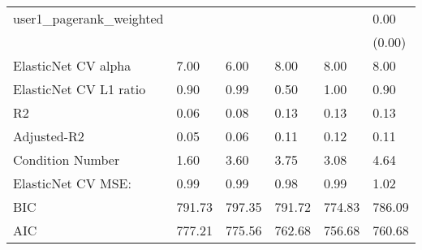 \begin{table}
\begin{center}
\begin{tabular}{llllll}
user1_pagerank_weighted                        &         &         &         &         & 0.00      \\
                                               &         &         &         &         & (0.00)    \\
ElasticNet CV alpha                            & 7.00    & 6.00    & 8.00    & 8.00    & 8.00      \\
ElasticNet CV  L1 ratio                        & 0.90    & 0.99    & 0.50    & 1.00    & 0.90      \\
R2                                             & 0.06    & 0.08    & 0.13    & 0.13    & 0.13      \\
Adjusted-R2                                    & 0.05    & 0.06    & 0.11    & 0.12    & 0.11      \\
Condition Number                               & 1.60    & 3.60    & 3.75    & 3.08    & 4.64      \\
ElasticNet CV MSE:                             & 0.99    & 0.99    & 0.98    & 0.99    & 1.02      \\
BIC                                            & 791.73  & 797.35  & 791.72  & 774.83  & 786.09    \\
AIC                                            & 777.21  & 775.56  & 762.68  & 756.68  & 760.68    \\
\hline
\end{tabular}
\end{center}
\end{table}